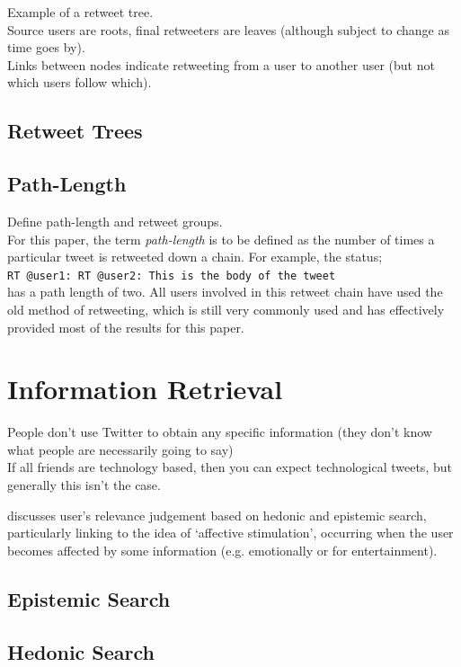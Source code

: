 Example of a retweet tree. 
\\
Source users are roots, final retweeters are leaves (although subject to change as time goes by).
\\
Links between nodes indicate retweeting from a user to another user (but not which users follow which).
\\
\subsection{Retweet Trees}

\subsection{Path-Length}
Define path-length and retweet groups.\\
For this paper, the term \textit{path-length} is to be defined as the number of times a particular tweet is retweeted down a chain. For example, the status;\\ \texttt{RT @user1: RT @user2: This is the body of the tweet} \\has a path length of two. All users involved in this retweet chain have used the old method of retweeting, which is still very commonly used and has effectively provided most of the results for this paper.\\

\section{Information Retrieval}
People don't use Twitter to obtain any specific information (they don't know what people are necessarily going to say) \\
If all friends are technology based, then you can expect technological tweets, but generally this isn't the case.

\cite{xu07} discusses user's relevance judgement based on hedonic and epistemic search, particularly linking to the idea of `affective stimulation', occurring when the user becomes affected by some information (e.g. emotionally or for entertainment).
\subsection{Epistemic Search}

\subsection{Hedonic Search}

